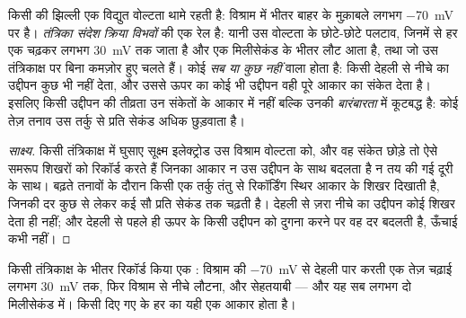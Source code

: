 \begin{proposition}[क्रिया विभव]\label{prop:g12:stretch-reflex:actionpotential}
किसी  की झिल्ली एक विद्युत वोल्टता थामे रहती है: विश्राम में भीतर
बाहर के मुक़ाबले लगभग \qty{-70}{mV} पर है।
\emph{तंत्रिका संदेश} \emph{क्रिया
विभवों} की एक रेल है: यानी उस वोल्टता के छोटे-छोटे पलटाव,
जिनमें से हर एक चढ़कर लगभग \qty{+30}{mV} तक जाता है और एक मिलीसेकंड के भीतर
लौट आता है, तथा जो उस तंत्रिकाक्ष पर बिना कमज़ोर हुए चलते हैं। कोई  \emph{सब या कुछ नहीं} वाला होता है: किसी देहली से नीचे का उद्दीपन कुछ
भी नहीं देता, और उससे ऊपर का कोई भी उद्दीपन वही पूरे आकार का संकेत देता है।
इसलिए किसी उद्दीपन की तीव्रता उन संकेतों के आकार में नहीं बल्कि उनकी
\emph{बारंबारता} में कूटबद्ध है: कोई तेज़ तनाव उस तर्कु से प्रति सेकंड अधिक
 छुड़वाता है।
\end{proposition}
\begin{proof}[साक्ष्य]
किसी तंत्रिकाक्ष में घुसाए सूक्ष्म इलेक्ट्रोड उस विश्राम वोल्टता को, और वह
 संकेत छोड़े तो ऐसे समरूप शिखरों को रिकॉर्ड करते हैं जिनका आकार न उस
उद्दीपन के साथ बदलता है न तय की गई दूरी के साथ। बढ़ते तनावों के दौरान किसी
एक तर्कु तंतु से रिकॉर्डिंग स्थिर आकार के शिखर दिखाती है, जिनकी दर कुछ से
लेकर कई सौ प्रति सेकंड तक चढ़ती है। देहली से ज़रा नीचे का उद्दीपन कोई शिखर
देता ही नहीं; और देहली से पहले ही ऊपर के किसी उद्दीपन को दुगना करने पर वह दर
बदलती है, ऊँचाई कभी नहीं।
\end{proof}

\begin{omfigure}

{\small किसी तंत्रिकाक्ष के भीतर रिकॉर्ड किया एक : विश्राम की
\qty{-70}{mV} से देहली पार करती एक तेज़ चढ़ाई लगभग \qty{+30}{mV} तक, फिर
विश्राम से नीचे लौटना, और सेहतयाबी --- और यह सब लगभग दो मिलीसेकंड में। किसी
दिए गए  के हर  का यही एक आकार होता है।}
\end{omfigure}

